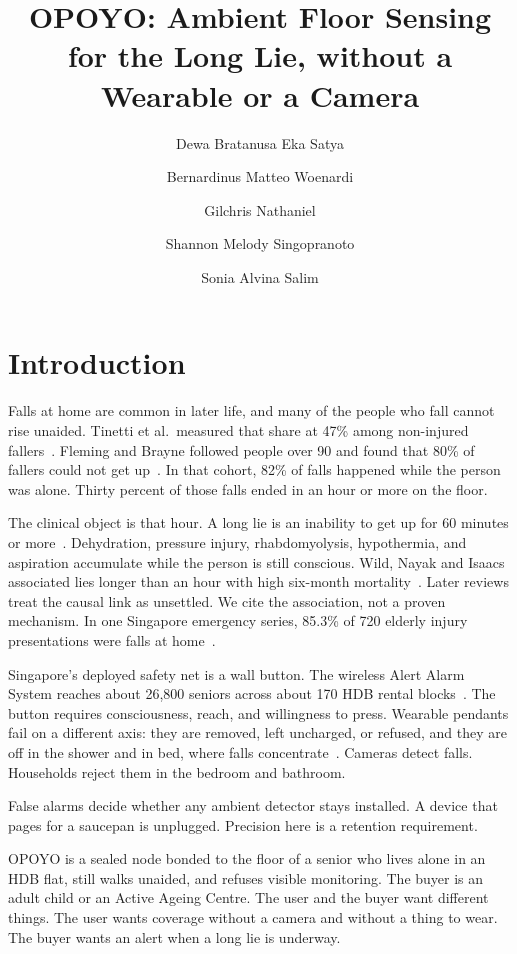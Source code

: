 \documentclass[sigconf]{acmart}
\title{OPOYO: Ambient Floor Sensing for the Long Lie, without a Wearable or a Camera}
\author{Dewa Bratanusa Eka Satya}
\author{Bernardinus Matteo Woenardi}
\author{Gilchris Nathaniel}
\author{Shannon Melody Singopranoto}
\author{Sonia Alvina Salim}
\affiliation{%
  \institution{Singapore Management University}
  \city{Singapore}
  \country{Singapore}
}
\begin{document}
\maketitle

\section{Introduction}

Falls at home are common in later life, and many of the people who fall cannot rise unaided. Tinetti et al.\ measured that share at 47\% among non-injured fallers~\cite{tinetti1993}. Fleming and Brayne followed people over 90 and found that 80\% of fallers could not get up~\cite{fleming2008}. In that cohort, 82\% of falls happened while the person was alone. Thirty percent of those falls ended in an hour or more on the floor.

The clinical object is that hour. A long lie is an inability to get up for 60 minutes or more~\cite{kubitza2023}. Dehydration, pressure injury, rhabdomyolysis, hypothermia, and aspiration accumulate while the person is still conscious. Wild, Nayak and Isaacs associated lies longer than an hour with high six-month mortality~\cite{wild1981}. Later reviews treat the causal link as unsettled. We cite the association, not a proven mechanism. In one Singapore emergency series, 85.3\% of 720 elderly injury presentations were falls at home~\cite{yeo2009}.

Singapore's deployed safety net is a wall button. The wireless Alert Alarm System reaches about 26{,}800 seniors across about 170 HDB rental blocks~\cite{moh2026}. The button requires consciousness, reach, and willingness to press. Wearable pendants fail on a different axis: they are removed, left uncharged, or refused, and they are off in the shower and in bed, where falls concentrate~\cite{hawley2014,igual2013}. Cameras detect falls. Households reject them in the bedroom and bathroom.

False alarms decide whether any ambient detector stays installed. A device that pages for a saucepan is unplugged. Precision here is a retention requirement.

OPOYO is a sealed node bonded to the floor of a senior who lives alone in an HDB flat, still walks unaided, and refuses visible monitoring. The buyer is an adult child or an Active Ageing Centre. The user and the buyer want different things. The user wants coverage without a camera and without a thing to wear. The buyer wants an alert when a long lie is underway.
\end{document}
